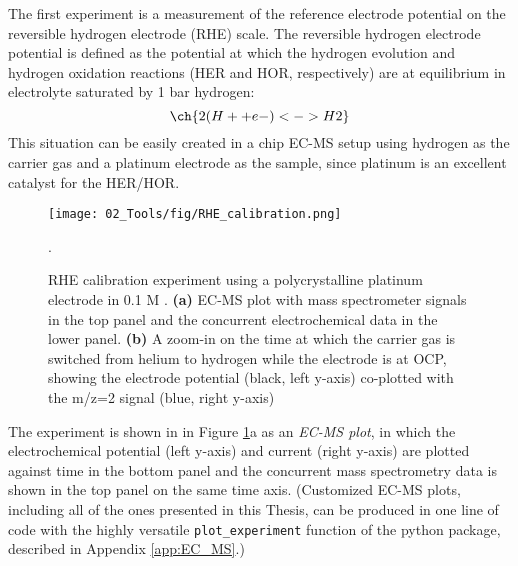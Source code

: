 The first experiment is a measurement of the reference electrode potential on the reversible hydrogen electrode (RHE) scale. The reversible hydrogen electrode potential is defined as the potential at which the hydrogen evolution and hydrogen oxidation reactions (HER and HOR, respectively) are at equilibrium in electrolyte saturated by 1 bar hydrogen:
\begin{equation}
\ch{2 (H+ + e- ) <-> H2} \label{rxn:HER2}
\end{equation}
This situation can be easily created in a chip EC-MS setup using hydrogen as the carrier gas and a platinum electrode as the sample, since platinum is an excellent catalyst for the HER/HOR\cite{Nørskov2005a, Kemppainen2015, Tymoczko2016}. 

\begin{figure}[h!]
	\centering
	\texttt{[image: 02\_Tools/fig/RHE\_calibration.png]}
	\caption{RHE calibration experiment using a polycrystalline platinum electrode in 0.1 M . \textbf{(a)} EC-MS plot with mass spectrometer signals in the top panel and the concurrent electrochemical data in the lower panel. \textbf{(b)} A zoom-in on the time at which the carrier gas is switched from helium to hydrogen while the electrode is at OCP, showing the electrode potential (black, left y-axis) co-plotted with the m/z=2 signal (blue, right y-axis)}.
	\label{fig:RHE_cal}
\end{figure}

The experiment is shown in  in Figure \ref{fig:RHE_cal}a as an \textit{EC-MS plot}, in which the electrochemical potential (left y-axis) and current (right y-axis) are plotted against time in the bottom panel and the concurrent mass spectrometry data is shown in the top panel on the same time axis. (Customized EC-MS plots, including all of the ones presented in this Thesis, can be produced in one line of code with the highly versatile \texttt{plot\_experiment} function of the  python package, described in Appendix \ref{app:EC_MS}.)


